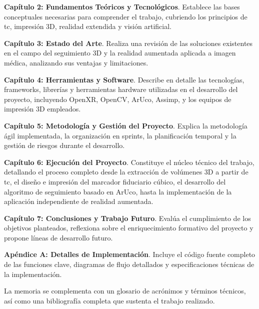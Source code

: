 \textbf{Capítulo 2: Fundamentos Teóricos y Tecnológicos}. Establece las bases conceptuales necesarias para comprender el trabajo, cubriendo los principios de \acrfull{tc}, impresión 3D, realidad extendida y visión artificial.

\textbf{Capítulo 3: Estado del Arte}. Realiza una revisión de las soluciones existentes en el campo del seguimiento 3D y la realidad aumentada aplicada a imagen médica, analizando sus ventajas y limitaciones.

\textbf{Capítulo 4: Herramientas y Software}. Describe en detalle las tecnologías, frameworks, librerías y herramientas hardware utilizadas en el desarrollo del proyecto, incluyendo OpenXR, OpenCV, ArUco, Assimp, y los equipos de impresión 3D empleados.

\textbf{Capítulo 5: Metodología y Gestión del Proyecto}. Explica la metodología ágil implementada, la organización en sprints, la planificación temporal y la gestión de riesgos durante el desarrollo.

\textbf{Capítulo 6: Ejecución del Proyecto}. Constituye el núcleo técnico del trabajo, detallando el proceso completo desde la extracción de volúmenes 3D a partir de \gls{tc}, el diseño e impresión del marcador fiduciario cúbico, el desarrollo del algoritmo de seguimiento basado en ArUco, hasta la implementación de la aplicación independiente de realidad aumentada.

\textbf{Capítulo 7: Conclusiones y Trabajo Futuro}. Evalúa el cumplimiento de los objetivos planteados, reflexiona sobre el enriquecimiento formativo del proyecto y propone líneas de desarrollo futuro.

\textbf{Apéndice A: Detalles de Implementación}. Incluye el código fuente completo de las funciones clave, diagramas de flujo detallados y especificaciones técnicas de la implementación.

La memoria se complementa con un glosario de acrónimos y términos técnicos, así como una bibliografía completa que sustenta el trabajo realizado.
